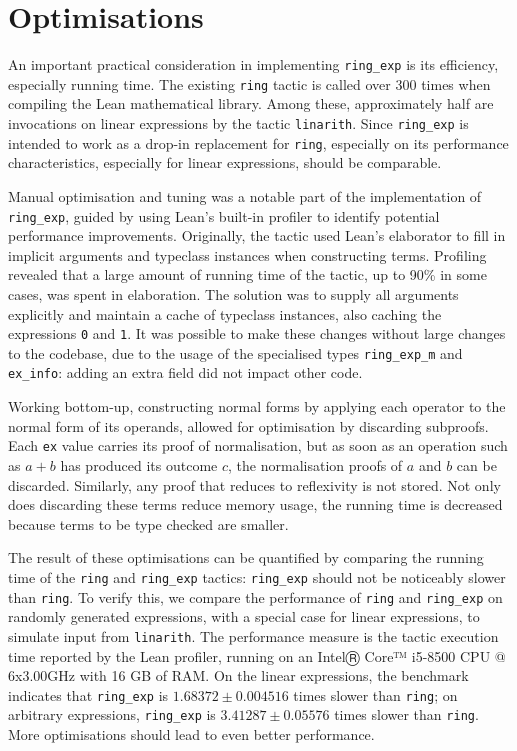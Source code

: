 \documentclass{llncs}
\newcommand{\lean}[1]{\texttt{#1}\xspace} %
\newcommand{\ring}{\lean{ring}}
\newcommand{\ringexp}{\lean{ring\_exp}}
\begin{document}

\section{Optimisations}

An important practical consideration in implementing \ringexp is its efficiency, especially running time.
The existing \lean{ring} tactic is called over 300 times when compiling the Lean mathematical library.
Among these, approximately half are invocations on linear expressions by the tactic \lean{linarith}.
Since \ringexp is intended to work as a drop-in replacement for \lean{ring},
especially on its performance characteristics, especially for linear expressions, should be comparable.

Manual optimisation and tuning was a notable part of the implementation of \ringexp,
guided by using Lean's built-in profiler to identify potential performance improvements.
Originally, the tactic used Lean's elaborator to fill in implicit arguments and typeclass instances when constructing terms.
Profiling revealed that a large amount of running time of the tactic, up to 90\% in some cases,
was spent in elaboration.
The solution was to supply all arguments explicitly and maintain a cache of typeclass instances,
also caching the expressions \lean{0} and \lean{1}.
It was possible to make these changes without large changes to the codebase,
due to the usage of the specialised types \lean{ring\_exp\_m} and \lean{ex\_info}:
adding an extra field did not impact other code.

Working bottom-up, constructing normal forms by applying each operator to the normal form of its operands,
allowed for optimisation by discarding subproofs.
Each \lean{ex} value carries its proof of normalisation,
but as soon as an operation such as $a + b$ has produced its outcome $c$,
the normalisation proofs of $a$ and $b$ can be discarded.
Similarly, any proof that reduces to reflexivity is not stored.
Not only does discarding these terms reduce memory usage,
the running time is decreased because terms to be type checked are smaller.

The result of these optimisations can be quantified by comparing the running time
of the \lean{ring} and \ringexp tactics: \ringexp should not be noticeably slower than \lean{ring}.
To verify this, we compare the performance of \lean{ring} and \ringexp on randomly generated expressions,
with a special case for linear expressions, to simulate input from \lean{linarith}.
The performance measure is the tactic execution time reported by the Lean profiler,
running on an IntelⓇ Core™ i5-8500 CPU @ 6x3.00GHz with 16 GB of RAM.
On the linear expressions, the benchmark indicates that \ringexp is $1.68372 \pm 0.004516$ times slower than \ring;
on arbitrary expressions, \ringexp is $3.41287 \pm 0.05576$ times slower than \ring.
More optimisations should lead to even better performance.
\end{document}
